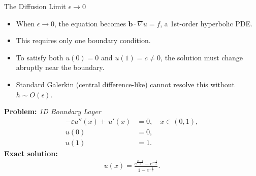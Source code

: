 \documentclass{beamer}
\begin{document}
\begin{frame}{The Diffusion Limit $\epsilon \to 0$}
    \begin{itemize}
        \item When $\epsilon \to 0$, the equation becomes $\textbf{b} \cdot \nabla u = f$, a 1st-order hyperbolic PDE. \pause
        \item This requires only one boundary condition. \pause
        \item To satisfy both $u(0)=0$ and $u(1)=c \neq 0$, the solution must change abruptly near the boundary. \pause
        \item Standard Galerkin (central difference-like) cannot resolve this without $h \sim O(\epsilon)$.
    \end{itemize}
    \vspace{0.1em}
    \pause
    \textbf{Problem:} \textit{1D Boundary Layer}
    \begin{align*}
    -\varepsilon u''(x) + \,u'(x) &= 0, \quad x \in (0,1), \\
    u(0) &= 0, \\
    u(1) &= 1.
    \end{align*}
    \pause
    \textbf{Exact solution:}
    \vspace{-0.25em}
    \begin{align*}
    u(x) = \frac{e^{\frac{x-1}{\varepsilon}} - e^{-\frac{1}{\varepsilon}}}{1 - e^{-\frac{1}{\varepsilon}}}.
    \end{align*}
\end{frame}
\end{document}
